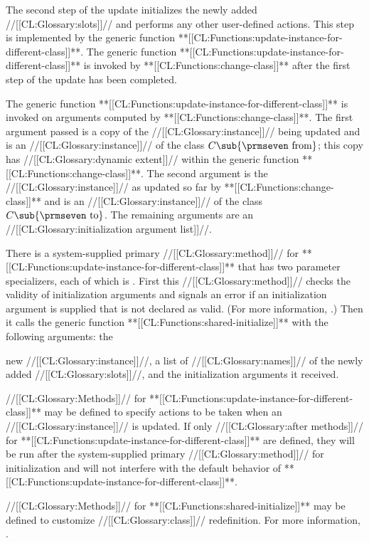  

The second step of the update initializes the newly added //[[CL:Glossary:slots]]// and performs any other user-defined actions.  This step is implemented by the generic function **[[CL:Functions:update-instance-for-different-class]]**.  The generic function **[[CL:Functions:update-instance-for-different-class]]** is invoked by **[[CL:Functions:change-class]]** after the first step of the update has been completed.

 The generic function **[[CL:Functions:update-instance-for-different-class]]** is invoked on arguments computed by **[[CL:Functions:change-class]]**. The first argument passed is a copy of the //[[CL:Glossary:instance]]// being updated  and is an //[[CL:Glossary:instance]]// of the class $C\sub {\hbox{{\prmseven from}}}$;  this copy has //[[CL:Glossary:dynamic extent]]// within the generic function **[[CL:Functions:change-class]]**.   The second argument is the //[[CL:Glossary:instance]]// as updated so far by **[[CL:Functions:change-class]]** and is an //[[CL:Glossary:instance]]// of the class $C\sub {\hbox{{\prmseven to}}}$. The remaining arguments are an //[[CL:Glossary:initialization argument list]]//.

There is a system-supplied primary //[[CL:Glossary:method]]// for  **[[CL:Functions:update-instance-for-different-class]]** that has two parameter specializers, each of which is .  First this //[[CL:Glossary:method]]// checks the validity of initialization arguments and signals an error if an initialization argument is supplied that is not declared as valid.  (For more information, \seesection\DeclaringInitargValidity.) Then it calls the generic function **[[CL:Functions:shared-initialize]]** with the following arguments: the

new //[[CL:Glossary:instance]]//, a list of //[[CL:Glossary:names]]// of the newly added  //[[CL:Glossary:slots]]//, and the initialization arguments it received.

\endsubsection%

              //[[CL:Glossary:Methods]]// for **[[CL:Functions:update-instance-for-different-class]]** may be defined to specify actions to be taken when an //[[CL:Glossary:instance]]// is updated.  If only //[[CL:Glossary:after methods]]// for **[[CL:Functions:update-instance-for-different-class]]** are defined, they will be run after the system-supplied primary //[[CL:Glossary:method]]// for initialization and will not interfere with the default behavior of **[[CL:Functions:update-instance-for-different-class]]**.

//[[CL:Glossary:Methods]]//  for **[[CL:Functions:shared-initialize]]** may be defined to customize //[[CL:Glossary:class]]// redefinition.  For more information, \seesection\SharedInitialize.
   \endsubsection%

